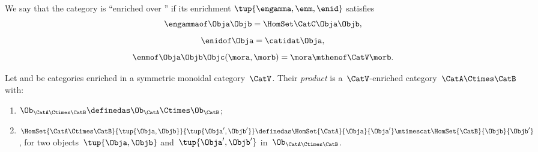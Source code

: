 

\begin{ctdefinition}
    We say that the category \CatC is ``enriched over \CatV'' if its enrichment $\tup{\engamma,\enm,\enid}$ satisfies
    \begin{equation}
        \engammaof\Obja\Objb = \HomSet\CatC\Obja\Objb,
    \end{equation}
    \begin{equation}
        \enidof\Obja = \catidat\Obja,
    \end{equation}
    \begin{equation}
        \enmof\Obja\Objb\Objc(\mora, \morb) = \mora \mthenof\CatV \morb.
    \end{equation}
\end{ctdefinition}

\begin{definition}
    \label{def:prod_enrich_cat}
    Let \CatA and \CatB be categories enriched in a symmetric monoidal category~$\CatV$.
    Their \emph{product} is a~$\CatV$-enriched category~$\CatA\Ctimes \CatB$ with:
    \begin{enumerate}
        \item $\Ob_{\CatA\Ctimes \CatB}\definedas \Ob_\CatA \Ctimes \Ob_\CatB$;
        \item $\HomSet{\CatA\Ctimes \CatB}{\tup{\Obja,\Objb}}{\tup{\Obja',\Objb'}}\definedas \HomSet{\CatA}{\Obja}{\Obja'}\mtimescat \HomSet{\CatB}{\Objb}{\Objb'}$, for two objects~$\tup{\Obja,\Objb}$ and~$\tup{\Obja',\Objb'}$ in~$\Ob_{\CatA\Ctimes \CatB}$.
    \end{enumerate}
\end{definition}


